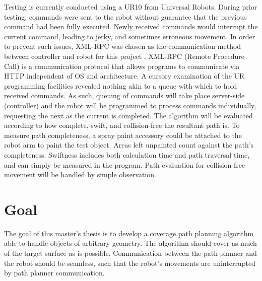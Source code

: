 \documentclass[a4paper, 10pt]{article}
\begin{document}
Testing is currently conducted using a UR10 from Universal Robots.
During prior testing, commands were sent to the robot without guarantee that the previous command had been fully executed.
Newly received commands would interrupt the current command, leading to jerky, and sometimes erroneous movement.
In order to prevent such issues, XML-RPC was chosen as the communication method between controller and robot for this project \cite{UR_XML-RPC}.
XML-RPC (Remote Procedure Call) is a communication protocol that allows programs to communicate via HTTP independent of OS and architecture.
A cursory examination of the UR programming facilities revealed nothing akin to a queue with which to hold received commands.
As such, queuing of commands will take place server-side (controller) and the robot will be programmed to process commands individually, requesting the next as the current is completed.
The algorithm will be evaluated according to how complete, swift, and collision-free the resultant path is.
To measure path completeness, a spray paint accessory could be attached to the robot arm to paint the test object.
Areas left unpainted count against the path's completeness.
Swiftness includes both calculation time and path traversal time, and can simply be measured in the program.
Path evaluation for collision-free movement will be handled by simple observation.

\section*{Goal}
The goal of this master's thesis is to develop a coverage path planning algorithm able to handle objects of arbitrary geometry.
The algorithm should cover as much of the target surface as is possible.
Communication between the path planner and the robot should be seamless, such that the robot's movements are uninterrupted by path planner communication.
\end{document}
